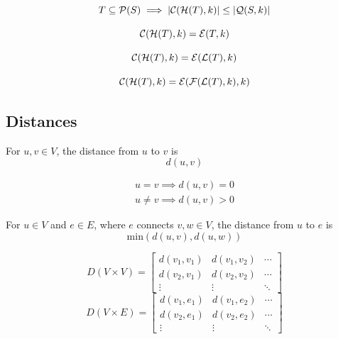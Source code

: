 \begin{corollary}
	\[ T \subseteq \mathcal{P}(S) \implies |\mathcal{C}(\mathcal{H}(T),k)| \leq |\mathcal{Q}(S,k)| \]
\end{corollary}

\begin{lemma}
	\[ \mathcal{C}(\mathcal{H}(T),k) = \mathcal{E}(T,k) \]
\end{lemma}

\begin{corollary}
	\[ \mathcal{C}(\mathcal{H}(T),k) = \mathcal{E}(\mathcal{L}(T),k) \]
\end{corollary}

\begin{theorem}
	\[ \mathcal{C}(\mathcal{H}(T),k) = \mathcal{E}(\mathcal{F}(\mathcal{L}(T),k),k) \]
\end{theorem}

\cleardoublepage
\subsection{Distances}

\begin{definition}
	For \(u, v \in V\), the distance from \(u\) to \(v\) is
		\[ d(u,v) \]
\end{definition}

\begin{corollary}
	\[\begin{array}{c}
		u = v \implies d(u,v) = 0 \\
		u \neq v \implies d(u,v) > 0
	\end{array}\]
\end{corollary}

\begin{definition}
	For \(u \in V\) and \(e \in E\), where \(e\) connects \(v, w \in V\), the distance from \(u\) to \(e\) is
		\[ \mathrm{min}(d(u,v),d(u,w)) \]
\end{definition}

\begin{definition}
	\[ D(V \times V) = \left[\begin{array}{ccc}
		d(v_1,v_1) & d(v_1,v_2) & \cdots \\
		d(v_2,v_1) & d(v_2,v_2) & \cdots \\
		\vdots     & \vdots     & \ddots
	\end{array}\right] \]
	\[ D(V \times E) = \left[\begin{array}{ccc}
		d(v_1,e_1) & d(v_1,e_2) & \cdots \\
		d(v_2,e_1) & d(v_2,e_2) & \cdots \\
		\vdots     & \vdots     & \ddots
	\end{array}\right]\]
\end{definition}

